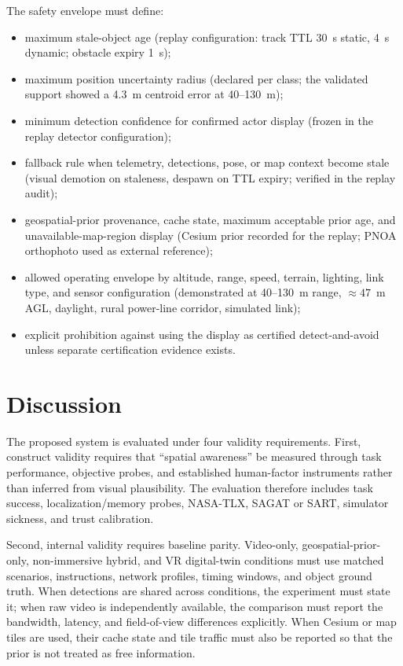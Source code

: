 \documentclass[fleqn]{VRIH2025}
\begin{document}
The safety envelope must define:

\begin{itemize}
    \item maximum stale-object age (replay configuration: track TTL 30~s static, 4~s dynamic; obstacle expiry 1~s);
    \item maximum position uncertainty radius (declared per class; the validated support showed a 4.3~m centroid error at 40--130~m);
    \item minimum detection confidence for confirmed actor display (frozen in the replay detector configuration);
    \item fallback rule when telemetry, detections, pose, or map context become stale (visual demotion on staleness, despawn on TTL expiry; verified in the replay audit);
    \item geospatial-prior provenance, cache state, maximum acceptable prior age, and unavailable-map-region display (Cesium prior recorded for the replay; PNOA orthophoto used as external reference);
    \item allowed operating envelope by altitude, range, speed, terrain, lighting, link type, and sensor configuration (demonstrated at 40--130~m range, ${\approx}47$~m AGL, daylight, rural power-line corridor, simulated link);
    \item explicit prohibition against using the display as certified detect-and-avoid unless separate certification evidence exists.
\end{itemize}

\section{Discussion}

The proposed system is evaluated under four validity requirements. First, construct validity requires that ``spatial awareness'' be measured through task performance, objective probes, and established human-factor instruments rather than inferred from visual plausibility. The evaluation therefore includes task success, localization/memory probes, NASA-TLX, SAGAT or SART, simulator sickness, and trust calibration.

Second, internal validity requires baseline parity. Video-only, geospatial-prior-only, non-immersive hybrid, and VR digital-twin conditions must use matched scenarios, instructions, network profiles, timing windows, and object ground truth. When detections are shared across conditions, the experiment must state it; when raw video is independently available, the comparison must report the bandwidth, latency, and field-of-view differences explicitly. When Cesium or map tiles are used, their cache state and tile traffic must also be reported so that the prior is not treated as free information.
\end{document}
